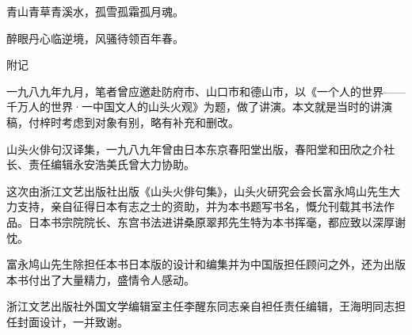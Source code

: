 {\begin{center}
    青山青草青溪水，孤雪孤霜孤月魂。

    醉眼丹心临逆境，风骚待领百年春。
\end{center}

{\Large 附记}

一九八九年九月，笔者曾应邀赴防府市、山口市和德山市，以《一个人的世界——千万人的世界·一中国文人的山头火观》为题，做了讲演。本文就是当时的讲演稿，付梓时考虑到对象有别，略有补充和删改。

山头火俳句汉译集，一九八九年曾由日本东京春阳堂出版，春阳堂和田欣之介社长、责任编辑永安浩美氏曾大力协助。

这次由浙江文艺出版社出版《山头火俳句集》，山头火研究会会长富永鸠山先生大力支持，亲自征得日本有志之士的资助，并为本书题写书名，慨允刊载其书法作品。日本书宗院院长、东宫书法进讲桑原翠邦先生特为本书挥毫，都应致以深厚谢忱。

富永鸠山先生除担任本书日本版的设计和编集并为中国版担任顾问之外，还为出版本书付出了大量精力，盛情令人感动。

浙江文艺出版社外国文学编辑室主任李醒东同志亲自袒任责任编辑，王海明同志担任封面设计，一并致谢。
}
